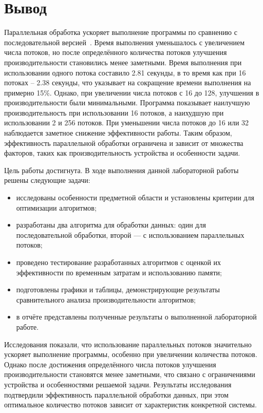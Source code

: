 \section*{Вывод}
Параллельная обработка ускоряет выполнение программы по сравнению с последовательной версией~\cite{albahari_threading}. Время выполнения уменьшалось с увеличением числа потоков, но после определённого количества потоков улучшения производительности становились менее заметными. 
Время выполнения при использовании одного потока составило 2.81 секунды, в то время как при 16 потоках -- 2.38 секунды, что указывает на сокращение времени выполнения на примерно 15\%. Однако, при увеличении числа потоков с 16 до 128, улучшения в производительности были минимальными. Программа показывает наилучшую производительность при использовании 16 потоков, а наихудшую при использовании 2 и 256 потоков. При уменьшении числа потоков до 16 или 32 наблюдается заметное снижение эффективности работы.
Таким образом, эффективность параллельной обработки ограничена и зависит от множества факторов, таких как производительность устройства и особенности задачи.
\clearpage


Цель работы достигнута. В ходе выполнения данной лабораторной работы решены следующие задачи:
\begin{itemize}
    \item исследованы особенности предметной области и установлены критерии для оптимизации алгоритмов;
    \item разработаны два алгоритма для обработки данных: один для последовательной обработки, второй — с использованием параллельных потоков;
    \item проведено тестирование разработанных алгоритмов с оценкой их эффективности по временным затратам и использованию памяти;
    \item подготовлены графики и таблицы, демонстрирующие результаты сравнительного анализа производительности алгоритмов;
    \item в отчёте представлены полученные результаты о выполненной лабораторной работе.
\end{itemize}

Исследования показали, что использование параллельных потоков значительно ускоряет выполнение программы, особенно при увеличении количества потоков. Однако после достижения определённого числа потоков улучшения производительности становятся менее заметными, что связано с ограничениями устройства и особенностями решаемой задачи. Результаты исследования подтвердили эффективность параллельной обработки данных, при этом оптимальное количество потоков зависит от характеристик конкретной системы.
